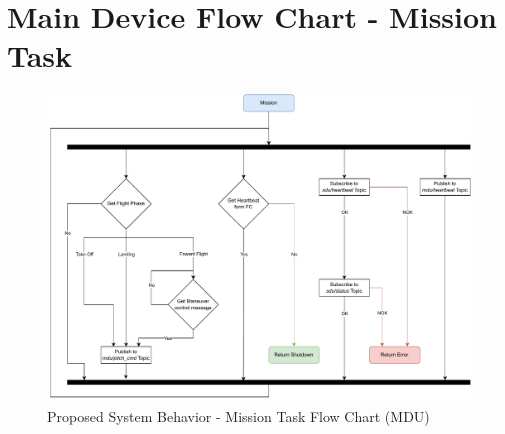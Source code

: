 
\chapter{Main Device Flow Chart - Mission Task} %

\label{AppendixB}

\begin{figure}[H]
    \centering
    \includegraphics[scale=0.6,angle=270,origin=c]{appendices/assets/MDU_MISSION.pdf}
    \caption{Proposed System Behavior - Mission Task Flow Chart (MDU)}
    \label{fig:MDU_MISSION}
\end{figure}


